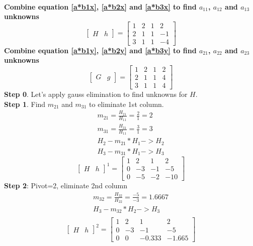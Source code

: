 \documentclass{article}
\begin{document}
\\
\textbf{Combine equation \ref{a*b1x}, \ref{a*b2x} and \ref{a*b3x} to find $a_{11}$, $a_{12}$ and $a_{13}$ unknowns}
\[
\left[
\begin{array}{c|c}
H&h
\end{array}
\right]
=
\left[
\begin{array}{ccc|c}
	1&2&1&2\\
	2&1&1&-1\\
	3&1&1&-4 
\end{array}
\right]
\]
\textbf{Combine equation \ref{a*b1y}, \ref{a*b2y} and \ref{a*b3y} to find $a_{21}$, $a_{22}$ and $a_{23}$ unknowns}
\[
\left[
\begin{array}{c|c}
G&g
\end{array}
\right]
=
\left[
\begin{array}{ccc|c}
	1&2&1&2\\
	2&1&1&4\\
	3&1&1&4
\end{array}
\right]
\]
\textbf{Step 0}. Let's apply gauss elimination to find unknowns for $H$.\\
\textbf{Step 1}. Find $m_{21}$ and $m_{31}$ to eliminate 1st column.\\
\begin{align}
	m_{21}=\frac{H_{21}}{H_{11}}=\frac{2}{1}=2\\
	m_{31}=\frac{H_{31}}{H_{11}}=\frac{3}{1}=3\\
	H_2-m_{21}*H_1 -> H_2\\
	H_3-m_{31}*H_1 -> H_3
\end{align}
\[
\left[
\begin{array}{c|c}
H&h
\end{array}
\right]^1
=
\left[
\begin{array}{ccc|c}
	1&2&1&2\\
	0&-3&-1&-5\\
	0&-5&-2&-10 
\end{array}
\right]
\]
\textbf{Step 2}: Pivot=2, eliminate 2nd column
\begin{align}
	m_{32}=\frac{H_{32}}{H_{22}}=\frac{-5}{-3}=1.6667\\
	H_3-m_{32}*H_2 -> H_3\\
\end{align}
\[
\left[
\begin{array}{c|c}
H&h
\end{array}
\right]^2
=
\left[
\begin{array}{ccc|c}
	1&2&1&2\\
	0&-3&-1&-5\\
	0&0&-0.333&-1.665
\end{array}
\right]
\]
\end{document}
